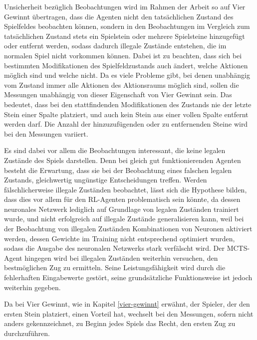 Unsicherheit bezüglich Beobachtungen wird im Rahmen der Arbeit so auf Vier Gewinnt übertragen, dass die Agenten nicht den tatsächlichen Zustand des Spielfeldes beobachten können, sondern in den Beobachtungen im Vergleich zum tatsächlichen Zustand stets ein Spielstein oder mehrere Spielsteine hinzugefügt oder entfernt werden, sodass dadurch illegale Zustände entstehen, die im normalen Spiel nicht vorkommen können. Dabei ist zu beachten, dass sich bei bestimmten Modifikationen des Spielfeldzustands auch ändert, welche Aktionen möglich sind und welche nicht. Da es viele Probleme gibt, bei denen unabhängig vom Zustand immer alle Aktionen des Aktionsraums möglich sind, sollen die Messungen unabhängig von dieser Eigenschaft von Vier Gewinnt sein. Das bedeutet, dass bei den stattfindenden Modifikationen des Zustands nie der letzte Stein einer Spalte platziert, und auch kein Stein aus einer vollen Spalte entfernt werden darf. Die Anzahl der hinzuzufügenden oder zu entfernenden Steine wird bei den Messungen variiert.

Es sind dabei vor allem die Beobachtungen interessant, die keine legalen Zustände des Spiels darstellen. Denn bei gleich gut funktionierenden Agenten besteht die Erwartung, dass sie bei der Beobachtung eines falschen legalen Zustands, gleichwertig ungünstige Entscheidungen treffen. Werden fälschlicherweise illegale Zuständen beobachtet, lässt sich die Hypothese bilden, dass dies vor allem für den RL-Agenten problematisch sein könnte, da dessen neuronales Netzwerk lediglich auf Grundlage von legalen Zuständen trainiert wurde, und nicht erfolgreich auf illegale Zustände generalisieren kann, weil bei der Beobachtung von illegalen Zuständen Kombinationen von Neuronen aktiviert werden, dessen Gewichte im Training nicht entsprechend optimiert wurden, sodass die Ausgabe des neuronalen Netzwerks stark verfälscht wird. Der MCTS-Agent hingegen wird bei illegalen Zuständen weiterhin versuchen, den bestmöglichen Zug zu ermitteln. Seine Leistungsfähigkeit wird durch die fehlerhaften Eingabewerte gestört, seine grundsätzliche Funktionsweise ist jedoch weiterhin gegeben.

Da bei Vier Gewinnt, wie in Kapitel \ref{vier-gewinnt} erwähnt, der Spieler, der den ersten Stein platziert, einen Vorteil hat, wechselt bei den Messungen, sofern nicht anders gekennzeichnet, zu Beginn jedes Spiels das Recht, den ersten Zug zu durchzuführen.

